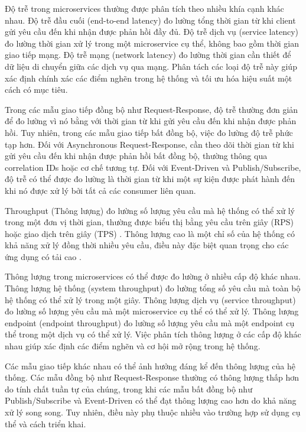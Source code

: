 Độ trễ trong microservices thường được phân tích theo nhiều khía cạnh khác nhau. Độ trễ đầu cuối (end-to-end latency) đo lường tổng thời gian từ khi client gửi yêu cầu đến khi nhận được phản hồi đầy đủ. Độ trễ dịch vụ (service latency) đo lường thời gian xử lý trong một microservice cụ thể, không bao gồm thời gian giao tiếp mạng. Độ trễ mạng (network latency) đo lường thời gian cần thiết để dữ liệu di chuyển giữa các dịch vụ qua mạng. Phân tách các loại độ trễ này giúp xác định chính xác các điểm nghẽn trong hệ thống và tối ưu hóa hiệu suất một cách có mục tiêu.

Trong các mẫu giao tiếp đồng bộ như Request-Response, độ trễ thường đơn giản để đo lường vì nó bằng với thời gian từ khi gửi yêu cầu đến khi nhận được phản hồi. Tuy nhiên, trong các mẫu giao tiếp bất đồng bộ, việc đo lường độ trễ phức tạp hơn. Đối với Asynchronous Request-Response, cần theo dõi thời gian từ khi gửi yêu cầu đến khi nhận được phản hồi bất đồng bộ, thường thông qua correlation IDs hoặc cơ chế tương tự. Đối với Event-Driven và Publish/Subscribe, độ trễ có thể được đo lường là thời gian từ khi một sự kiện được phát hành đến khi nó được xử lý bởi tất cả các consumer liên quan.

Throughput (Thông lượng) đo lường số lượng yêu cầu mà hệ thống có thể xử lý trong một đơn vị thời gian, thường được biểu thị bằng yêu cầu trên giây (RPS) hoặc giao dịch trên giây (TPS) \cite{jun2018}. Thông lượng cao là một chỉ số của hệ thống có khả năng xử lý đồng thời nhiều yêu cầu, điều này đặc biệt quan trọng cho các ứng dụng có tải cao \cite{aksakalli2021}.

Thông lượng trong microservices có thể được đo lường ở nhiều cấp độ khác nhau. Thông lượng hệ thống (system throughput) đo lường tổng số yêu cầu mà toàn bộ hệ thống có thể xử lý trong một giây. Thông lượng dịch vụ (service throughput) đo lường số lượng yêu cầu mà một microservice cụ thể có thể xử lý. Thông lượng endpoint (endpoint throughput) đo lường số lượng yêu cầu mà một endpoint cụ thể trong một dịch vụ có thể xử lý. Việc phân tích thông lượng ở các cấp độ khác nhau giúp xác định các điểm nghẽn và cơ hội mở rộng trong hệ thống.

Các mẫu giao tiếp khác nhau có thể ảnh hưởng đáng kể đến thông lượng của hệ thống. Các mẫu đồng bộ như Request-Response thường có thông lượng thấp hơn do tính chất tuần tự của chúng, trong khi các mẫu bất đồng bộ như Publish/Subscribe và Event-Driven có thể đạt thông lượng cao hơn do khả năng xử lý song song. Tuy nhiên, điều này phụ thuộc nhiều vào trường hợp sử dụng cụ thể và cách triển khai.

